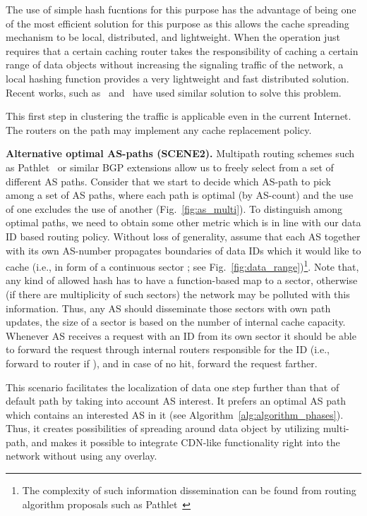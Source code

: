 \documentclass[article]{elsarticle}
\begin{document}
The use of simple hash fucntions for this purpose has the advantage of being one of the most efficient solution for this purpose as this allows the cache spreading mechanism to be local, distributed, and lightweight. When the operation just requires that a certain caching router takes the responsibility of caching a certain range of data objects without increasing the signaling traffic of the network, a local hashing function provides a very lightweight and fast distributed solution. Recent works, such as~\cite{saino2013hash} and~\cite{myinfocom} have used similar solution to solve this problem.  
 
This first step in clustering the traffic is applicable even in the current Internet. The routers on the path may implement any cache replacement policy.

\textbf{Alternative optimal AS-paths (SCENE2).} Multipath routing schemes such as Pathlet~\cite{pathlet} or similar BGP extensions allow us to freely select from a set of different AS paths. Consider that we start to decide which AS-path to pick among a set of AS paths, where each path is optimal (by AS-count) and the use of one excludes the use of another (Fig.~\ref{fig:as_multi}). To distinguish among optimal paths, we need to obtain some other metric which is in line with our data ID based routing policy. Without loss of generality, assume that each AS together with its own AS-number propagates boundaries of data IDs which it would like to cache (i.e., in form of a continuous sector ; see Fig.~\ref{fig:data_range})\footnote{The complexity of such information dissemination can be found from routing algorithm proposals such as Pathlet~\cite{pathlet}}. Note that, any kind of allowed hash has to have a function-based map to a sector, otherwise (if there are multiplicity of such sectors) the network may be polluted with this information. Thus, any AS should disseminate those sectors with own path updates, the size of a sector is based on the number of internal cache capacity. Whenever AS receives a request with an ID from its own sector  it should be able to forward the request through internal routers responsible for the ID (i.e., forward to router  if ), and in case of no hit, forward the request farther. 

This scenario facilitates the localization of data one step further than that of default path by taking into account AS interest. It prefers an optimal AS path which contains an interested AS in it (see Algorithm~\ref{alg:algorithm_phases}). Thus, it creates possibilities of spreading around data object by utilizing multi-path, and makes it possible to integrate CDN-like functionality right into the network without using any overlay.
\end{document}
